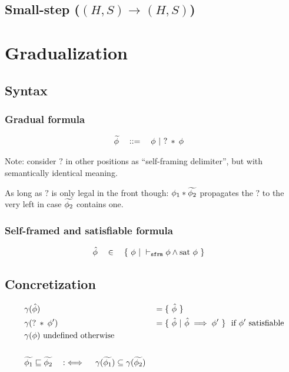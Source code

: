 \documentclass[11pt,a4paper]{article}
\begin{document}
\newcommand{\dType}[4]{#1, #2 \vdash #3 : #4}

\newcommand{\sstepGeneric}[5]{({#1}, {#2}) \rightarrow^{#3} ({#4}, {#5})}
\newcommand{\sstep}[4]{\sstepGeneric {#1} {#2} {} {#3} {#4}}
\newcommand{\sstepM}[4]{\sstepGeneric {#1} {#2} * {#3} {#4}} 
\newcommand{\sstepWS}[4]{\sstepGeneric {#1} {{#2} \cdot S} {} {#3} {{#4} \cdot S}}
\newcommand{\sstepWSX}[8]{\sstepGeneric {#1} {({#2},{#3},{#4}) \cdot S} {} {#5} {({#6},{#7},{#8}) \cdot S}}

\newcommand{\Tfs}{\overline{T}~\overline{f}}
\subsection{Small-step ($\sstep H S H S$)}

%

\section{Gradualization}
\subsection{Syntax}
\subsubsection{Gradual formula}
\begin{align*}
&\widetilde{\phi} \quad ::= \quad \phi ~|~ ?\:*\:\phi
\end{align*}

Note: consider $?$ in other positions as ``self-framing delimiter'', but with semantically identical meaning.

As long as $?$ is only legal in the front though: $\phi_1 * \widetilde{\phi_2}$ propagates the $?$ to the very left in case $\widetilde{\phi_2}$ contains one.

\subsubsection{Self-framed and satisfiable formula}
\begin{align*}
&\hat{\phi} \quad \in \quad \{~ \phi ~|~ \vdash_\texttt{sfrm} \phi \wedge \text{sat~} \phi ~\}
\end{align*}

\subsection{Concretization}
\begin{align*}
&\gamma(\hat{\phi}) ~&&= \{~ \hat{\phi} ~\} \\
&\gamma(?\:*\:\phi') ~&&= \{~ \hat{\phi} ~|~ \hat{\phi} \implies \phi' ~\} \text{~~if $\phi'$ satisfiable} \\
&\gamma(\phi) \text{ undefined otherwise} \\
~\\
&\widetilde{\phi_1} \sqsubseteq \widetilde{\phi_2} \quad:\iff\quad \gamma(\widetilde{\phi_1}) \subseteq \gamma(\widetilde{\phi_2})
\end{align*}
\end{document}
